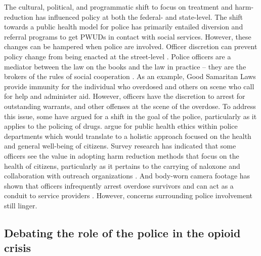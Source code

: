The cultural, political, and programmatic shift to focus on treatment and harm-reduction has influenced policy at both the federal- and state-level. The shift towards a public health model for police has primarily entailed diversion and referral programs to get PWUDs in contact with social services. However, these changes can be hampered when police are involved. Officer discretion can prevent policy change from being enacted at the street-level \parencite{friedman_intersectional_2021}. Police officers are a mediator between the law on the books and the law in practice – they are the brokers of the rules of social cooperation \parencite{del_pozo_arrest_2022}. As an example, Good Samaritan Laws provide immunity for the individual who overdosed and others on scene who call for help and administer aid. However, officers have the discretion to arrest for outstanding warrants, and other offenses at the scene of the overdose. To address this issue, some have argued for a shift in the goal of the police, particularly as it applies to the policing of drugs. \textcite{del_pozo_beyond_2021} argue for public health ethics within police departments which would translate to a holistic approach focused on the health and general well-being of citizens. Survey research has indicated that some officers see the value in adopting harm reduction methods that focus on the health of citizens, particularly as it pertains to the carrying of naloxone and collaboration with outreach organizations \parencite{banta-green_police_2013, lloyd_its_2023, white_moving_2021}. And body-worn camera footage has shown that officers infrequently arrest overdose survivors and can act as a conduit to service providers \parencite{white_leveraging_2022}. However, concerns surrounding police involvement still linger. 

\subsection{Debating the role of the police in the opioid crisis} 

